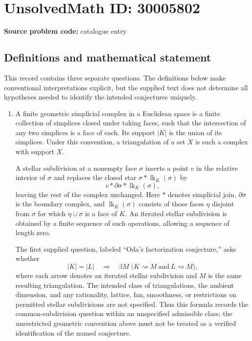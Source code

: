 \documentclass[11pt]{article}
\begin{document}
\section*{UnsolvedMath ID: 30005802}
\textbf{Source problem code:} catalogue entry
\subsection{Definitions and mathematical statement}
This record contains three separate questions. The definitions below make conventional interpretations explicit, but the supplied text does not determine all hypotheses needed to identify the intended conjectures uniquely.

\begin{enumerate}
\item A finite geometric simplicial complex in a Euclidean space is a finite collection of simplices closed under taking faces, such that the intersection of any two simplices is a face of each. Its support \(|K|\) is the union of its simplices. Under this convention, a triangulation of a set \(X\) is such a complex with support \(X\).

A stellar subdivision at a nonempty face \(\sigma\) inserts a point \(v\) in the relative interior of \(\sigma\) and replaces the closed star \(\sigma*\operatorname{lk}_K(\sigma)\) by
\[
v*\partial\sigma*\operatorname{lk}_K(\sigma),
\]
leaving the rest of the complex unchanged. Here \(*\) denotes simplicial join, \(\partial\sigma\) is the boundary complex, and \(\operatorname{lk}_K(\sigma)\) consists of those faces \(\eta\) disjoint from \(\sigma\) for which \(\eta\cup\sigma\) is a face of \(K\). An iterated stellar subdivision is obtained by a finite sequence of such operations, allowing a sequence of length zero.

The first supplied question, labeled ``Oda's factorization conjecture,'' asks whether
\[
|K|=|L|\quad\Longrightarrow\quad
\exists M\;\bigl(K\rightsquigarrow M\ \text{and}\ L\rightsquigarrow M\bigr),
\]
where each arrow denotes an iterated stellar subdivision and \(M\) is the same resulting triangulation. The intended class of triangulations, the ambient dimension, and any rationality, lattice, fan, smoothness, or restrictions on permitted stellar subdivisions are not specified. Thus this formula records the common-subdivision question within an unspecified admissible class; the unrestricted geometric convention above must not be treated as a verified identification of the named conjecture.


\end{enumerate}
\end{document}
